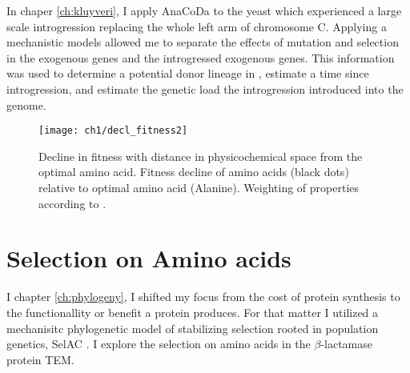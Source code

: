 In chaper \ref{ch:kluyveri}, I apply AnaCoDa to the yeast \kluyveri which experienced a large scale introgression replacing the whole left arm of chromosome C.
Applying a mechanistic models allowed me to separate the effects of mutation and selection in the exogenous \kluyveri genes and the introgressed exogenous genes.
This information was used to determine a potential donor lineage in \gossypii, estimate a time since introgression, and estimate the genetic load the introgression introduced into the  \kluyveri genome.

\begin{figure}[H]
     \centering
	\texttt{[image: ch1/decl\_fitness2]}
	\caption{Decline in fitness with distance in physicochemical space from the optimal amino acid. 
	Fitness decline of amino acids (black dots) relative to optimal amino acid (Alanine). Weighting of properties according to \citet{grantham1974}.}
	\label{fig:decl_fit}
\end{figure}

\section{Selection on Amino acids}

I chapter \ref{ch:phylogeny}, I shifted my focus from the cost of protein synthesis to the functionallity or benefit a protein produces.
For that matter I utilized a mechanisitc phylogenetic model of stabilizing selection rooted in population genetics, SelAC \cite{beaulieu2018}.
I explore the selection on amino acids in the $\beta$-lactamase protein TEM.
 








